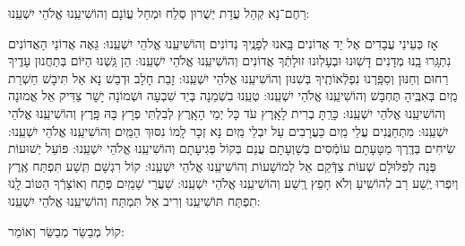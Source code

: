 \documentclass[twoside, openany, parskip=half, 11pt]{book}
\begin{document}
 רַחֶם־נָא קְהַל עֲדַת יְשֻׁרוּן סְלַח וּמְחַל עֲוֹנָם וְהוֹשִׁיעֵֽנוּ אֱלֹהֵי יִשְׁעֵֽנוּ:


\begin{small}
אָז כְּעֵינֵי עֲבָדִים אֶל יַד אֲדוֹנִים 		בָּֽאנוּ לְפָנֶֽיךָ נְדוֹנִים 		וְהוֹשִׁיעֵֽנוּ אֱלֹהֵי יִשְׁעֵֽנוּ: 
גֵּאֶה אֲדוֹנֵי הָאֲדוֹנִים נִתְגָּֽרוּ בָֽנוּ מְדָנִים 	דָּשֽׁוּנוּ וּבְעָלֽוּנוּ זוּלָתְֿךָ אֲדוֹנִים 	וְהוֹשִׁיעֵֽנוּ אֱלֹהֵי יִשְׁעֵֽנוּ:	
הֵן גַּֽשְׁנוּ הַיּוֹם בְּתַחֲנוּן עָדֶֽיךָ רַחוּם וְחַנּוּן 	וְסִפַּֽרְנוּ נִפְלְֿאוֹתֶֽיךָ בְּשִׁנּוּן 	וְהוֹשִׁיעֵֽנוּ אֱלֹהֵי יִשְׁעֵֽנוּ:
 	זָבַת חָלָב וּדְבַשׁ נָא אַל תִּיבָשׁ 		חַשְׁרַת מַֽיִם בְּאִבֶּֽיהָ תֶּחְבָּשׁ 	וְהוֹשִׁיעֵֽנוּ אֱלֹהֵי יִשְׁעֵֽנוּ: 
טְעֵֽנוּ בִשְׁמֵנָה בְּיַד שִׁבְעָה וּשְׁמוֹנָה 		יָשָׁר צַדִּיק אֵל אֱמוּנָה 		וְהוֹשִׁיעֵֽנוּ אֱלֹהֵי יִשְׁעֵֽנוּ: 
כָּרַֽתָּ בְרִית לָאָֽרֶץ עֹד כָּל יְמֵי הָאָֽרֶץ 	לְבִלְתִּי פְרָץ בָּהּ פָּֽרֶץ 		וְהוֹשִׁיעֵֽנוּ אֱלֹהֵי יִשְׁעֵֽנוּ: 
מִתְחַנֲּנִים עֲלֵי מַֽיִם כַּעֲרָבִים עַל יִבְלֵי מַֽיִם 	נָא זְכָר לָֽמוֹ נִסּוּךְ הַמַּֽיִם 	וְהוֹשִׁיעֵֽנוּ אֱלֹהֵי יִשְׁעֵֽנוּ: 
שִׂיחִים בְּדֶֽרֶךְ מַטָּעָתָם עוֹמְֿסִים בְּשַׁוְעָתָם 	עֲנֵם בְּקוֹל פְּגִיעָתָם 		וְהוֹשִׁיעֵֽנוּ אֱלֹהֵי יִשְׁעֵֽנוּ: 
פּוֹעֵל יְשׁוּעוֹת פְּנֵה לְפִלּוּלָם שְׁעוֹת 		צַדְּֿקֵם אֵל לְמוֹשָׁעוֹת 		וְהוֹשִׁיעֵֽנוּ אֱלֹהֵי יִשְׁעֵֽנוּ: 
קוֹל רִגְשָׁם תִּֽשַׁע תִּפְתַּח אֶֽרֶץ וְיִפְרוּ יֶֽשַׁע 	רַב לְהוֹשִֽׁיעַ וְלֹא חָפֵץ רֶֽשַׁע 	וְהוֹשִׁיעֵֽנוּ אֱלֹהֵי יִשְׁעֵֽנוּ:
שַׁעֲרֵי שָׁמַֽיִם פְּתַח וְאוֹצָרְֿךָ הַטּוֹב לָֽנוּ תִפְתַּח 	תּוֹשִׁיעֵֽנוּ וְרִיב אַל תִּמְתַּח 	וְהוֹשִׁיעֵֽנוּ אֱלֹהֵי יִשְׁעֵֽנוּ:

\end{small}

\begin{large}
 קוֹל מְבַשֵּׂר מְבַשֵּׂר וְאוֹמֵר:
 
\end{large}
\end{document}
